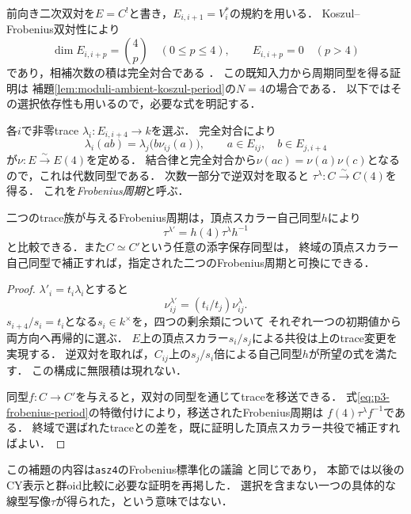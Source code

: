 前向き二次双対を$E=C^!$と書き，$E_{i,i+1}=V_i^*$の規約を用いる．
Koszul--Frobenius双対性により
\begin{equation}\label{eq:p3-local-frobenius}
 \dim E_{i,i+p}=\binom4p\quad(0\le p\le4),\qquad
 E_{i,i+p}=0\quad(p>4)
\end{equation}
であり，相補次数の積は完全対合である
\cite[Proposition~4.1, \S5]{PBondalPolishchukHelices}．
この既知入力から周期同型を得る証明は
補題\ref{lem:moduli-ambient-koszul-period}の$N=4$の場合である．
以下ではその選択依存性も用いるので，必要な式を明記する．

各$i$で非零trace $\lambda_i:E_{i,i+4}\to k$を選ぶ．
完全対合により
\begin{equation}\label{eq:p3-frobenius-period}
 \lambda_i(ab)=\lambda_j\bigl(b\nu_{ij}(a)\bigr),
 \qquad a\in E_{ij},\quad b\in E_{j,i+4}
\end{equation}
が$\nu:E\xrightarrow{\sim}E(4)$を定める．
結合律と完全対合から$\nu(ac)=\nu(a)\nu(c)$となるので，これは代数同型である．
次数一部分で逆双対を取ると
$\tau^\lambda:C\xrightarrow{\sim}C(4)$を得る．
これを\emph{Frobenius周期}と呼ぶ．

\begin{lemma}[Frobenius周期の選択独立性]
\label{lem:p3-canonical-period}
二つのtrace族が与えるFrobenius周期は，頂点スカラー自己同型$h$により
\[
 \tau^{\lambda'}=h(4)\tau^\lambda h^{-1}
\]
と比較できる．また$C\simeq C'$という任意の添字保存同型は，
終域の頂点スカラー自己同型で補正すれば，指定された二つのFrobenius周期と可換にできる．
\end{lemma}
\begin{proof}
$\lambda'_i=t_i\lambda_i$とすると
\[
 \nu^{\lambda'}_{ij}=(t_i/t_j)\nu^\lambda_{ij}.
\]
$s_{i+4}/s_i=t_i$となる$s_i\in k^\times$を，四つの剰余類について
それぞれ一つの初期値から両方向へ再帰的に選ぶ．
$E$上の頂点スカラー$s_i/s_j$による共役は上のtrace変更を実現する．
逆双対を取れば，$C_{ij}$上の$s_j/s_i$倍による自己同型$h$が所望の式を満たす．
この構成に無限積は現れない．

同型$f:C\to C'$を与えると，双対の同型を通じてtraceを移送できる．
式\eqref{eq:p3-frobenius-period}の特徴付けにより，移送されたFrobenius周期は
$f(4)\tau^\lambda f^{-1}$である．
終域で選ばれたtraceとの差を，既に証明した頂点スカラー共役で補正すればよい．
\end{proof}

この補題の内容は\texttt{asz4}のFrobenius標準化の議論
\cite[定理\texttt{canonical-four}]{ASZ4Canonical}と同じであり，
本節では以後のCY表示と群oid比較に必要な証明を再掲した．
選択を含まない一つの具体的な線型写像$\tau$が得られた，という意味ではない．

